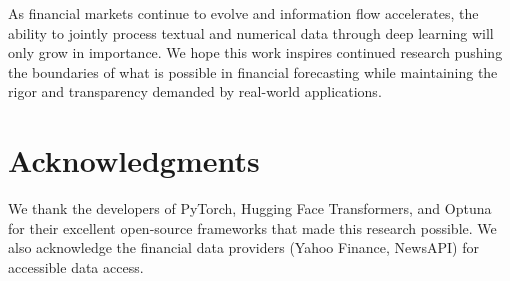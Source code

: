\documentclass[conference]{IEEEtran}
\begin{document}
As financial markets continue to evolve and information flow accelerates, the ability to jointly process textual and numerical data through deep learning will only grow in importance. We hope this work inspires continued research pushing the boundaries of what is possible in financial forecasting while maintaining the rigor and transparency demanded by real-world applications.

\section*{Acknowledgments}

We thank the developers of PyTorch, Hugging Face Transformers, and Optuna for their excellent open-source frameworks that made this research possible. We also acknowledge the financial data providers (Yahoo Finance, NewsAPI) for accessible data access.



\end{document}
